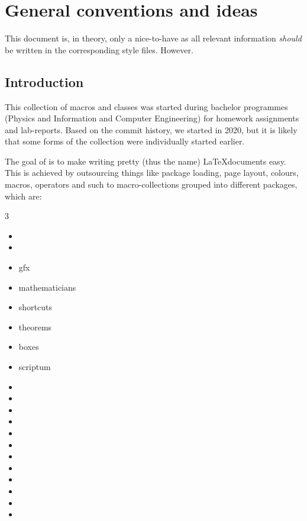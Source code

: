 \section{General conventions and ideas}

This document is, in theory, only a nice-to-have as all relevant information \textit{should} be written in the corresponding style files. However.

\subsection{Introduction}

This collection of macros and classes was started during bachelor programmes (Physics and Information and Computer Engineering) for homework assignments and lab-reports. Based on the commit history, we started in 2020, but it is likely that some forms of the collection were individually started earlier.

The goal of \prettytex{} is to make writing pretty (thus the name) \LaTeX documents easy. This is achieved by outsourcing things like package loading, page layout, colours, macros, operators and such to macro-collections grouped into different packages, which are:

\begin{multicols}{3}
    \begin{itemize}
        \item {}
        \item {}
        \item gfx
        \item mathematicians
        \item shortcuts
        \item theorems
        \item boxes
        \item scriptum
        \item {}
        \item {}
        \item {}
        \item {}
        \item {}
        \item {}
        \item {}
        \item {}
        \item {}
        \item {}
        \item {}
        \item {}
    \end{itemize}
\end{multicols}

